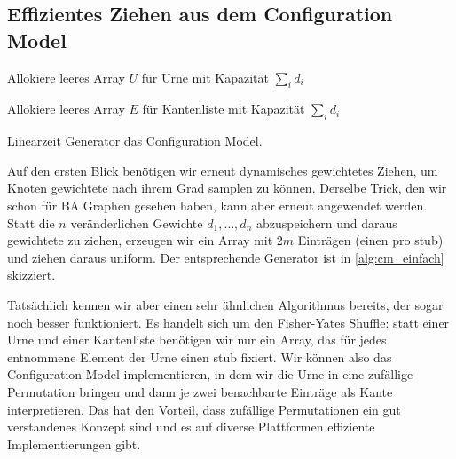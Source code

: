 \subsection{Effizientes Ziehen aus dem Configuration Model}
\begin{algorithm}[t]



    Allokiere leeres Array $U$ für Urne mit Kapazität $\sum_i d_i$\;

    Allokiere leeres Array $E$ für Kantenliste mit Kapazität $\sum_i d_i$\;

    \caption{Linearzeit Generator das Configuration Model.}
    \label{alg:cm_einfach}
    \vspace{1em}
\end{algorithm}


Auf den ersten Blick benötigen wir erneut dynamisches gewichtetes Ziehen, um Knoten gewichtete nach ihrem Grad samplen zu können.
Derselbe Trick, den wir schon für BA Graphen gesehen haben, kann aber erneut angewendet werden.
Statt die $n$ veränderlichen Gewichte $d_1, \ldots, d_n$ abzuspeichern und daraus gewichtete zu ziehen, erzeugen wir ein Array mit $2m$ Einträgen (einen pro stub) und ziehen daraus uniform.
Der entsprechende Generator ist in \cref{alg:cm_einfach} skizziert.

Tatsächlich kennen wir aber einen sehr ähnlichen Algorithmus bereits, der sogar noch besser funktioniert.
Es handelt sich um den Fisher-Yates Shuffle: statt einer Urne und einer Kantenliste benötigen wir nur ein Array, das für jedes entnommene Element der Urne einen stub fixiert.
Wir können also das Configuration Model implementieren, in dem wir die Urne in eine zufällige Permutation bringen und dann je zwei benachbarte Einträge als Kante interpretieren.
Das hat den Vorteil, dass zufällige Permutationen ein gut verstandenes Konzept sind und es auf diverse Plattformen effiziente Implementierungen gibt.

